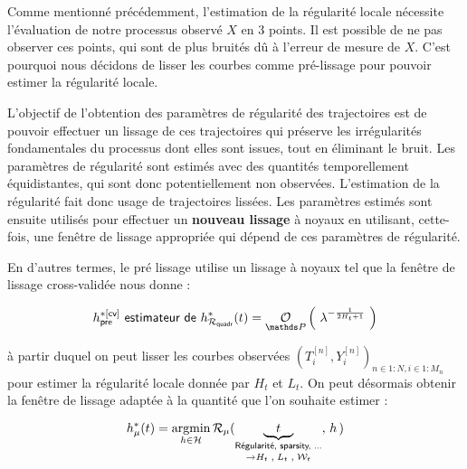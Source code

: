 
Comme mentionné précédemment, l'estimation de la régularité locale nécessite l'évaluation de notre processus observé $X$ en 3 points. Il est possible de ne pas observer ces points, qui sont de plus bruités dû à l'erreur de mesure de $X$. C'est pourquoi nous décidons de lisser les courbes comme \og pré-lissage \fg pour pouvoir estimer la régularité locale.


L'objectif de l'obtention des paramètres de régularité des trajectoires est de pouvoir effectuer un lissage de ces trajectoires qui préserve les irrégularités fondamentales du processus dont elles sont issues, tout en éliminant le bruit. Les paramètres de régularité sont estimés avec des quantités temporellement équidistantes, qui sont donc potentiellement non observées. L'estimation de la régularité fait donc usage de trajectoires lissées. Les paramètres estimés sont ensuite utilisés pour effectuer un \textbf{nouveau lissage} à noyaux en utilisant, cette-fois, une fenêtre de lissage appropriée qui dépend de ces paramètres de régularité.

\smallskip

\noindent En d'autres termes, le pré lissage utilise un lissage à noyaux tel que la fenêtre de lissage cross-validée nous donne :

\begin{equation}
	h^{*[\textsf{cv}]}_{\textsf{pre}} \textsf{ estimateur de } h^*_{\mathcal R_{\textsf{quadr}}}(t) = \grandop{ \lambda^{- \frac 1 {2  H_t + 1}}} \label{eq:h_cross_noyau_pre}
\end{equation}

\noindent à partir duquel on peut lisser les courbes observées $( T_i^{[n]}, Y_i^{[n]} )_{n \in 1:N, i \in 1:M_n}$ pour estimer la régularité locale donnée par $H_t$ et $L_t$. On peut désormais obtenir la fenêtre de lissage adaptée à la quantité que l'on souhaite estimer :

\begin{equation}
	h_\mu^*(t) = \argmin\limits_{h \in \mathcal H} \mathcal R_\mu(\underset {\rightarrow H_t \;, \; L_t \; , \; \mathcal W_t}{\underbrace{\quad t \quad}_{\textsf{Régularité, sparsity, ...}}}, \, h \, )
\end{equation}




